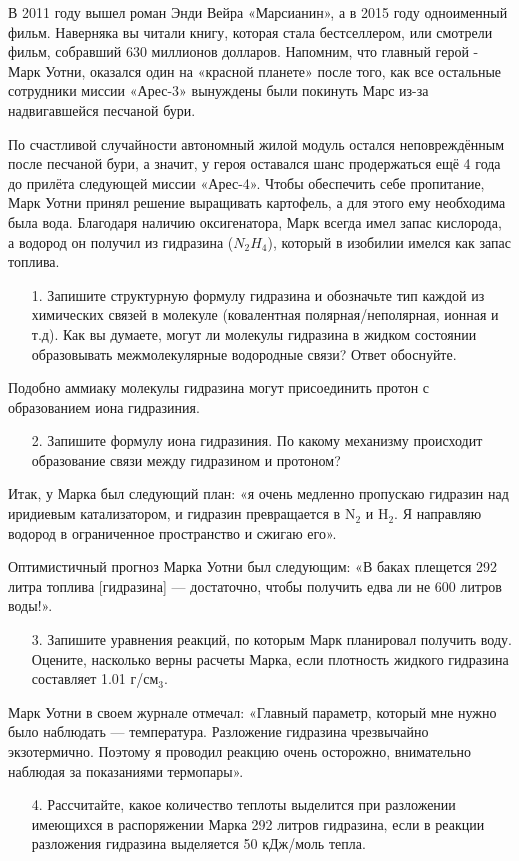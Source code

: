
В 2011 году вышел роман Энди Вейра «Марсианин», а в 2015 году одноименный фильм. Наверняка вы читали книгу, которая стала бестселлером, или смотрели фильм, собравший 630 миллионов долларов. Напомним, что главный герой - Марк Уотни, оказался один на «красной планете» после того, как все остальные сотрудники миссии «Арес-3» вынуждены были покинуть Марс из-за надвигавшейся песчаной бури.

По счастливой случайности автономный жилой модуль остался неповреждённым после песчаной бури, а значит, у героя оставался шанс продержаться ещё 4 года до прилёта следующей миссии «Арес-4». Чтобы обеспечить себе пропитание, Марк Уотни принял решение выращивать картофель, а для этого ему необходима была вода. Благодаря наличию оксигенатора, Марк всегда имел запас кислорода, а водород он получил из гидразина ($N_2H_4$), который в изобилии имелся как запас топлива. 

\begin{enumerate}
    \item[1.] Запишите структурную формулу гидразина и обозначьте тип каждой из химических связей в молекуле (ковалентная полярная/неполярная, ионная и т.д). Как вы думаете, могут ли молекулы гидразина в жидком состоянии образовывать межмолекулярные водородные связи?  Ответ обоснуйте.
\end{enumerate}
Подобно аммиаку молекулы гидразина могут присоединить протон с образованием иона гидразиния. 
\begin{enumerate}
    \item[2.] Запишите формулу иона гидразиния. По какому механизму происходит образование связи между гидразином и протоном?
\end{enumerate}
Итак, у Марка был следующий план: «я очень медленно пропускаю гидразин над иридиевым катализатором, и гидразин превращается в N$_2$ и H$_2$. Я направляю водород в ограниченное пространство и сжигаю его».

Оптимистичный прогноз Марка Уотни был следующим: «В баках плещется 292 литра топлива [гидразина] — достаточно, чтобы получить едва ли не 600 литров воды!».
\begin{enumerate}
\item[3.] Запишите уравнения реакций, по которым Марк планировал получить воду. Оцените, насколько верны расчеты Марка, если плотность жидкого гидразина составляет 1.01 г/см$_3$.
\end{enumerate}

Марк Уотни в своем журнале отмечал: «Главный параметр, который мне нужно было наблюдать — температура. Разложение гидразина чрезвычайно экзотермично. Поэтому я проводил реакцию очень осторожно, внимательно наблюдая за показаниями термопары».

\begin{enumerate}
\item[4.] Рассчитайте, какое количество теплоты выделится при разложении имеющихся в распоряжении Марка 292 литров гидразина, если в реакции разложения гидразина выделяется 50 кДж/моль тепла. 
\end{enumerate}

